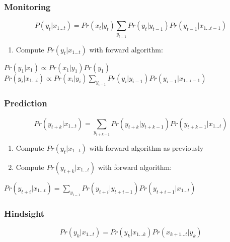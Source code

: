 \documentclass[]{article}
\theoremstyle{definition}
\begin{document}
\subsubsection{Monitoring}
\begin{equation*}
    P(y_t | x_{1 \ldots t}) = Pr(x_t | y_t) \sum_{y_{t-1}} Pr(y_t | y_{t-1}) Pr(y_{t-1} | x_{1 \ldots t-1})
\end{equation*}

\begin{enumerate}
    \item Compute $Pr(y_t | x_{1 \ldots t})$ with forward algorithm:
\end{enumerate}

\begin{algorithmic}
    \State $Pr(y_1 | x_1) \propto Pr(x_1 | y_1) Pr(y_1)$
    \State $Pr(y_i | x_{1 \ldots i}) \propto Pr(x_i | y_i) \sum_{y_{i-1}} Pr(y_i | y_{i-1}) Pr(y_{i-1} | x_{1 \ldots i-1})$
    \EndFor
\end{algorithmic}

\subsubsection{Prediction}
\label{ssub:Prediction}

\begin{equation*}
    Pr(y_{t+k} | x_{1 \ldots t}) = \sum_{y_{t + k -1}} Pr(y_{t+k} | y_{t+k-1}) Pr(y_{t+k-1} | x_{1 \ldots t})
\end{equation*}

\begin{enumerate}
    \item Compute $Pr(y_t | x_{1 \ldots t})$ with forward algorithm as previously
    \item Compute $Pr(y_{t+k} | x_{1 \ldots t})$ with forward algorithm:
\end{enumerate}

\begin{algorithmic}
    \State $Pr(y_{t+i} | x_{1 \ldots t}) = \sum_{y_{i-1}} Pr(y_{t+i} | y_{t+i-1}) Pr(y_{t+i-1} | x_{1 \ldots t})$
    \EndFor
\end{algorithmic}

\subsubsection{Hindsight}
\label{ssub:Hindsight}

\begin{equation*}
    Pr(y_k | x_{1 \ldots t}) = Pr(y_k | x_{1 \ldots k}) Pr(x_{k+1 \ldots t} | y_k)
\end{equation*}
\end{document}
